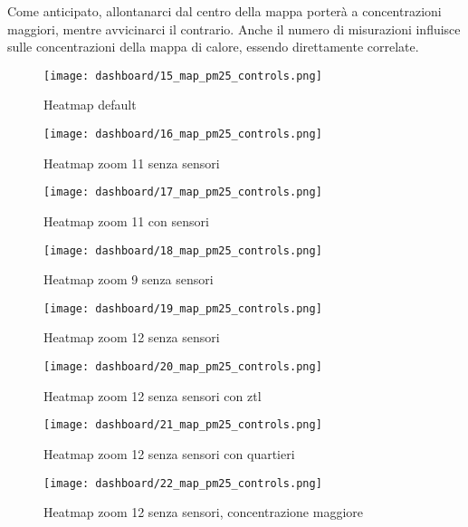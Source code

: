 Come anticipato, allontanarci dal centro della mappa porterà a concentrazioni maggiori, mentre avvicinarci il contrario.
Anche il numero di misurazioni influisce sulle concentrazioni della mappa di calore, essendo direttamente correlate.

\begin{figure}[H]
  \centering
  \texttt{[image: dashboard/15\_map\_pm25\_controls.png]}
  \caption{Heatmap default}
  \label{fig:app-map-pm25-controls-15}

  \hfill

  \texttt{[image: dashboard/16\_map\_pm25\_controls.png]}
  \caption{Heatmap zoom 11 senza sensori}
  \label{fig:app-map-pm25-controls-16}
\end{figure}

\begin{figure}[H]
  \centering
  \texttt{[image: dashboard/17\_map\_pm25\_controls.png]}
  \caption{Heatmap zoom 11 con sensori}
  \label{fig:app-map-pm25-controls-17}

  \hfill

  \texttt{[image: dashboard/18\_map\_pm25\_controls.png]}
  \caption{Heatmap zoom 9 senza sensori}
  \label{fig:app-map-pm25-controls-18}
\end{figure}

\begin{figure}[H]
  \centering
  \texttt{[image: dashboard/19\_map\_pm25\_controls.png]}
  \caption{Heatmap zoom 12 senza sensori}
  \label{fig:app-map-pm25-controls-19}

  \hfill

  \texttt{[image: dashboard/20\_map\_pm25\_controls.png]}
  \caption{Heatmap zoom 12 senza sensori con \acrshort{ztl}}
  \label{fig:app-map-pm25-controls-20}
\end{figure}

\begin{figure}[H]
  \centering
  \texttt{[image: dashboard/21\_map\_pm25\_controls.png]}
  \caption{Heatmap zoom 12 senza sensori con quartieri}
  \label{fig:app-map-pm25-controls-21}

  \hfill

  \texttt{[image: dashboard/22\_map\_pm25\_controls.png]}
  \caption{Heatmap zoom 12 senza sensori, concentrazione maggiore}
  \label{fig:app-map-pm25-controls-22}
\end{figure}

